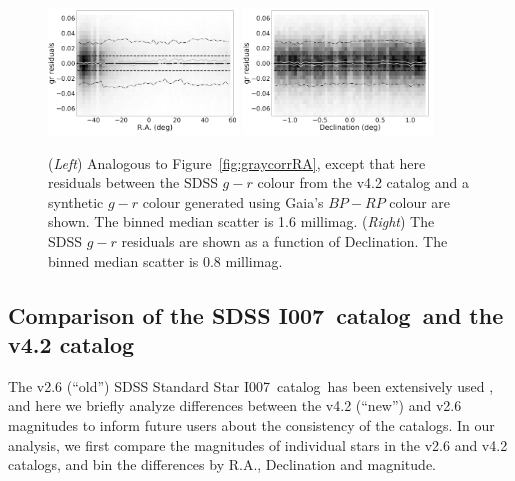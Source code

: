 \documentclass[fleqn,usenatbib]{mnras}
\newcommand{\pOc}{\hbox{I007 catalog}}
\begin{document}
\begin{figure}
    \centering\includegraphics[width=0.45\textwidth]{figures/colorResidGaiaColors_gr_RA_Hess_lr.png} 
    \centering\includegraphics[width=0.45\textwidth]{figures/colorResidGaiaColors_gr_Dec_Hess_lr.png} 
\caption{({\it Left}) Analogous to Figure~\ref{fig:graycorrRA}, except that here residuals between
the SDSS $g-r$ colour from the v4.2 catalog and a synthetic $g-r$ colour generated using 
Gaia's $BP-RP$ colour are shown. The binned median scatter is 1.6 millimag. ({\it Right}) The 
SDSS $g-r$ residuals are shown as a function of Declination. The binned median scatter is 
0.8 millimag.}
\label{fig:grVSgaiaRADec}
\end{figure}
 



\subsection{Comparison of the SDSS \pOc\ and the v4.2 catalog \label{sec:v26v42}} 

The v2.6 (``old'') SDSS Standard Star \pOc\  has been extensively used 
\citep[e.g.,][]{2008AJ....135..338F},
and here we briefly analyze differences between the v4.2 (``new'') and v2.6 magnitudes
to inform future users about the consistency of the catalogs. 
In our analysis, we first compare the magnitudes of individual stars in the v2.6 and v4.2 catalogs, and 
bin the differences by R.A., Declination and magnitude. 
\end{document}
